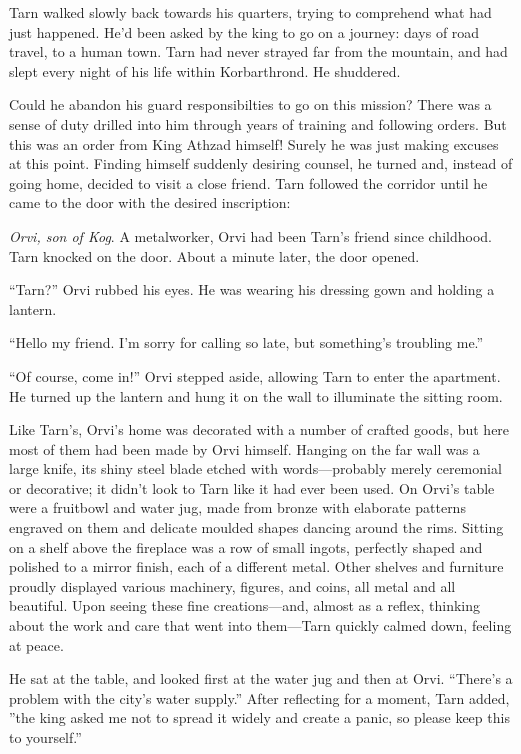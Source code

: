 
Tarn walked slowly back towards his quarters, trying to comprehend what had just happened.  He'd been asked by the king to go on a journey: days of road travel, to a human town.  Tarn had never strayed far from the mountain, and had slept every night of his life within Korbarthrond.  He shuddered.

Could he abandon his guard responsibilties to go on this mission?  There was a sense of duty drilled into him through years of training and following orders.  But this was an order from King Athzad himself!  Surely he was just making excuses at this point.  Finding himself suddenly desiring counsel, he turned and, instead of going home, decided to visit a close friend.  Tarn followed the corridor until he came to the door with the desired inscription:


\emph{Orvi, son of Kog}.  A metalworker, Orvi had been Tarn's friend since childhood.  Tarn knocked on the door.  About a minute later, the door opened.

``Tarn?''  Orvi rubbed his eyes.  He was wearing his dressing gown and holding a lantern.

``Hello my friend.  I'm sorry for calling so late, but something's troubling me.''

``Of course, come in!''  Orvi stepped aside, allowing Tarn to enter the apartment.  He turned up the lantern and hung it on the wall to illuminate the sitting room.

Like Tarn's, Orvi's home was decorated with a number of crafted goods, but here most of them had been made by Orvi himself.  Hanging on the far wall was a large knife, its shiny steel blade etched with words---probably merely ceremonial or decorative; it didn't look to Tarn like it had ever been used.  On Orvi's table were a fruitbowl and water jug, made from bronze with elaborate patterns engraved on them and delicate moulded shapes dancing around the rims.   Sitting on a shelf above the fireplace was a row of small ingots, perfectly shaped and polished to a mirror finish, each of a different metal.  Other shelves and furniture proudly displayed various machinery, figures, and coins, all metal and all beautiful.  Upon seeing these fine creations---and, almost as a reflex, thinking about the work and care that went into them---Tarn quickly calmed down, feeling at peace.

He sat at the table, and looked first at the water jug and then at Orvi.  ``There's a problem with the city's water supply.''  After reflecting for a moment, Tarn added, ''the king asked me not to spread it widely and create a panic, so please keep this to yourself.''

